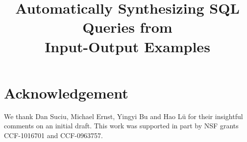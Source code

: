 \documentclass[conference]{IEEEtran}
\begin{document}
\title{Automatically Synthesizing SQL Queries from \\Input-Output Examples}



\author{
}


\maketitle






\vspace{-1mm}


\vspace{-1mm}


\vspace{-1mm}


\vspace{-1mm}


\vspace{-1mm}


\vspace{-1mm}






\vspace{-1mm}

\section{Acknowledgement}

We thank Dan Suciu, Michael Ernst, Yingyi Bu and Hao L{\"u} for their insightful comments
on an initial draft. This
work was supported in part by NSF grants
CCF-1016701 and CCF-0963757.


%
%

%


\end{document}
